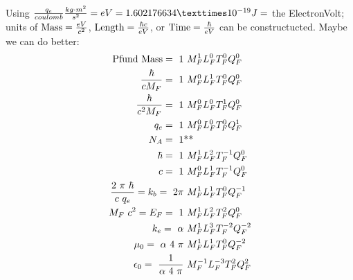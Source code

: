 
\maketitle
\begin{multicols}{2}
Using ${q_e \over coulomb}{kg\cdot m^2 \over s^2}=eV=1.602176634×10^{-19} J =$ the ElectronVolt; units of $\text{Mass}={eV \over c^2}$, $\text{Length}={\hbar c \over eV}$, or $\text{Time}={\hbar \over eV}$ can be constructucted.  Maybe we can do better:
\begin{align*}
\text{Pfund Mass} = ~1 &~M_F^{1}L_F^{0}T_F^{0}Q_F^{0}\\
{\hbar \over c M_F} = ~1 &~M_F^{0}L_F^{1}T_F^{0}Q_F^{0}\\
{\hbar \over c^2 M_F} = ~1&~M_F^{0}L_F^{0}T_F^{1}Q_F^{0}\\
q_e = ~1 &~M_F^{0}L_F^{0}T_F^{0}Q_F^{1}\\
N_A = ~1 &\text{**}\\
\hbar = ~1 & ~M_F^{1}L_F^{2}T_F^{-1}Q_F^{0}\\
c = ~1 & ~M_F^{0}L_F^{1}T_F^{-1}Q_F^{0}\\
{2~\pi~\hbar \over c ~ q_e}=k_b = ~2\pi & ~M_F^{1}L_F^{1}T_F^{0}Q_F^{-1}\\
M_F~ c^2 =E_F = ~1 & ~M_F^{1}L_F^{2}T_F^{2}Q_F^{0}\\
k_e = ~\alpha &~M_F^{1}L_F^{3}T_F^{-2}Q_F^{-2}\\
\mu _0 = ~\alpha~4~\pi &~M_F^{1}L_F^{1}T_F^{0}Q_F^{-2}\\
\epsilon _0 = ~{1 \over \alpha~4~\pi} & ~M_F^{-1}L_F^{-3}T_F^{2}Q_F^{2}\\%

\end{align*}
\end{multicols}
